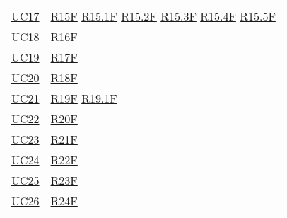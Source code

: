 \begin{center}
\begin{longtable}[!h]{m{50px} m{50px}}
        \hyperref[sec:UC17]{UC17}         & \hyperref[tab:RequisitiFunzionali]{R15F}
        \newline \hyperref[tab:RequisitiFunzionali]{R15.1F}
        \newline \hyperref[tab:RequisitiFunzionali]{R15.2F}
        \newline \hyperref[tab:RequisitiFunzionali]{R15.3F}
        \newline \hyperref[tab:RequisitiFunzionali]{R15.4F}
        \newline \hyperref[tab:RequisitiFunzionali]{R15.5F}                             \\

        \hyperref[sec:UC18]{UC18}         & \hyperref[tab:RequisitiFunzionali]{R16F}    \\

        \hyperref[sec:UC19]{UC19}         & \hyperref[tab:RequisitiFunzionali]{R17F}    \\

        \hyperref[sec:UC20]{UC20}         & \hyperref[tab:RequisitiFunzionali]{R18F}    \\

        \hyperref[sec:UC21]{UC21}         & \hyperref[tab:RequisitiFunzionali]{R19F}
        \newline \hyperref[tab:RequisitiFunzionali]{R19.1F}                             \\


        \hyperref[sec:UC22]{UC22}         & \hyperref[tab:RequisitiFunzionali]{R20F}    \\

        \hyperref[sec:UC23]{UC23}         & \hyperref[tab:RequisitiFunzionali]{R21F}    \\

        \hyperref[sec:UC24]{UC24}         & \hyperref[tab:RequisitiFunzionali]{R22F}    \\

        \hyperref[sec:UC25]{UC25}         & \hyperref[tab:RequisitiFunzionali]{R23F}    \\

        \hyperref[sec:UC26]{UC26}         & \hyperref[tab:RequisitiFunzionali]{R24F}    \\


\end{longtable}
\end{center}
